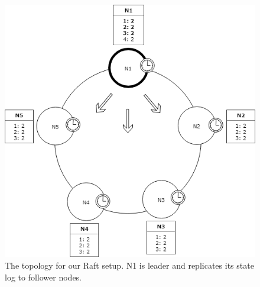 \begin{figure}[H]
	\centering
	\includegraphics[scale=0.4]{faultTolerance/fig/Raft.png}
	\caption{The topology for our Raft setup. N1 is leader and replicates its state log to follower nodes.}
	\label{fig:raft}
\end{figure}


